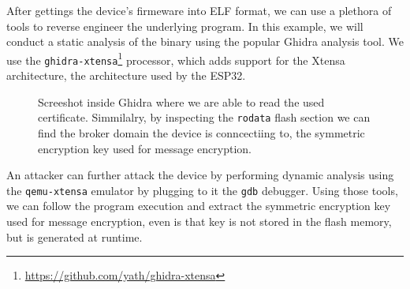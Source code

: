 \documentclass[conference]{IEEEtran}
\begin{document}
After gettings the device's firmeware into ELF format, we can use a plethora of tools 
to reverse engineer the underlying program. 
In this example, we will conduct a static analysis of the binary using the popular Ghidra\cite{Ghidra,GhidraBook} analysis tool.
We use the \texttt{ghidra-xtensa}\footnote{\url{https://github.com/yath/ghidra-xtensa}} processor,
which adds support for the Xtensa architecture, the architecture used by the ESP32.

\begin{figure}[h]
    \centering
    \caption{Screeshot inside Ghidra where we are able to read the used certificate. Simmilalry, 
    by inspecting the \texttt{rodata} flash section we can find the broker domain the device is conncectiing to, the 
    symmetric encryption key used for message encryption.}
    \label{fig:ghidra}
\end{figure}

An attacker can further attack the device by performing dynamic analysis using the \texttt{qemu-xtensa} emulator
by plugging to it the \texttt{gdb} debugger. 
Using those tools, we can follow the program execution and extract the symmetric encryption key used for message encryption, 
even is that key is not stored in the flash memory, but is generated at runtime.
\end{document}
